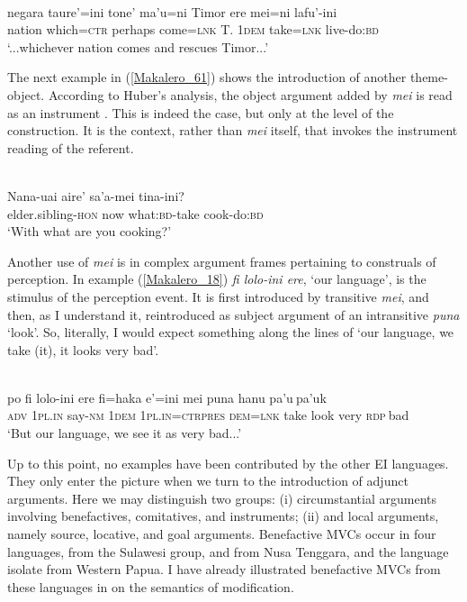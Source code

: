 \ea \label{Makalero_56}
\\
\gll negara taure’=ini tone’ ma’u=ni Timor ere mei=ni lafu’-ini \\
nation which=\textsc{ctr} perhaps come=\textsc{lnk} T. 1\textsc{dem} take=\textsc{lnk} live-do:\textsc{bd} \\
\glft `...whichever nation comes and rescues Timor...’\\ 
\z

The next example in (\ref{Makalero_61}) shows the introduction of another theme-object. According to Huber's analysis, the object argument added by \textit{mei} is read as an instrument \citep[204]{huber2011}. This is indeed the case, but only at the level of the construction. It is the context, rather than \textit{mei} itself, that invokes the instrument reading of the referent.

\ea \label{Makalero_61}
\\
\gll Nana-uai aire’ sa’a-mei tina-ini? \\
elder.sibling-\textsc{hon} now what:\textsc{bd}-take cook-do:\textsc{bd} \\
\glft ‘With what are you cooking?’\\ 
\z

Another use of \textit{mei} is in complex argument frames pertaining to construals of perception. In example (\ref{Makalero_18}) \textit{fi lolo-ini ere}, `our language', is the stimulus of the perception event. It is first introduced by transitive \textit{mei}, and then, as I understand it, reintroduced as subject argument of an intransitive \textit{puna} `look'. So, literally, I would expect something along the lines of `our language, we take (it), it looks very bad'.

\ea \label{Makalero_18}
\\
\gll po fi lolo-ini ere fi=haka e’=ini mei puna hanu pa’u$~$pa’uk \\
\textsc{adv} 1\textsc{pl}.\textsc{in} say-\textsc{nm} 1\textsc{dem} 1\textsc{pl}.\textsc{in}=\textsc{ctrpres} \textsc{dem}=\textsc{lnk} take look very \textsc{rdp}$~$bad \\
\glft ‘But our language, we see it as very bad...’\\ 
\z

Up to this point, no examples have been contributed by the other EI languages. They only enter the picture when we turn to the introduction of adjunct arguments. Here we may distinguish two groups: (i) circumstantial arguments involving benefactives, comitatives, and instruments; (ii) and local arguments, namely source, locative, and goal arguments. Benefactive MVCs occur in four languages,  from the Sulawesi group,  and  from Nusa Tenggara, and the language isolate  from Western Papua. I have already illustrated benefactive MVCs from these languages in  on the semantics of modification.

